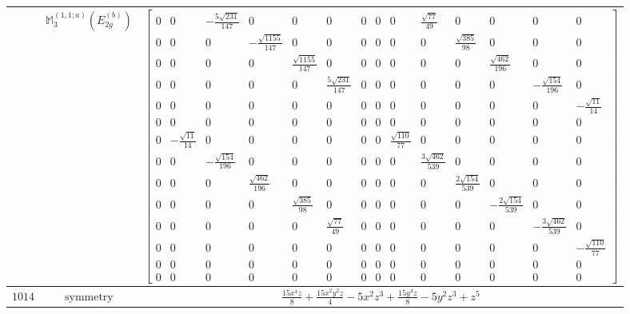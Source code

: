 \documentclass[fleqn,8pt,landscape]{jsarticle}
\begin{document}
\begin{longtable}{ccc}
$  $ & $ \mathbb{M}_{3}^{(1,1;a)}(E_{2g}^{(b)}) $ & $ \begin{bmatrix} 0 & 0 & - \frac{5 \sqrt{231}}{147} & 0 & 0 & 0 & 0 & 0 & 0 & \frac{\sqrt{77}}{49} & 0 & 0 & 0 & 0 \\ 0 & 0 & 0 & - \frac{\sqrt{1155}}{147} & 0 & 0 & 0 & 0 & 0 & 0 & \frac{\sqrt{385}}{98} & 0 & 0 & 0 \\ 0 & 0 & 0 & 0 & \frac{\sqrt{1155}}{147} & 0 & 0 & 0 & 0 & 0 & 0 & \frac{\sqrt{462}}{196} & 0 & 0 \\ 0 & 0 & 0 & 0 & 0 & \frac{5 \sqrt{231}}{147} & 0 & 0 & 0 & 0 & 0 & 0 & - \frac{\sqrt{154}}{196} & 0 \\ 0 & 0 & 0 & 0 & 0 & 0 & 0 & 0 & 0 & 0 & 0 & 0 & 0 & - \frac{\sqrt{11}}{14} \\ 0 & 0 & 0 & 0 & 0 & 0 & 0 & 0 & 0 & 0 & 0 & 0 & 0 & 0 \\ 0 & - \frac{\sqrt{11}}{14} & 0 & 0 & 0 & 0 & 0 & 0 & \frac{\sqrt{110}}{77} & 0 & 0 & 0 & 0 & 0 \\ 0 & 0 & - \frac{\sqrt{154}}{196} & 0 & 0 & 0 & 0 & 0 & 0 & \frac{3 \sqrt{462}}{539} & 0 & 0 & 0 & 0 \\ 0 & 0 & 0 & \frac{\sqrt{462}}{196} & 0 & 0 & 0 & 0 & 0 & 0 & \frac{2 \sqrt{154}}{539} & 0 & 0 & 0 \\ 0 & 0 & 0 & 0 & \frac{\sqrt{385}}{98} & 0 & 0 & 0 & 0 & 0 & 0 & - \frac{2 \sqrt{154}}{539} & 0 & 0 \\ 0 & 0 & 0 & 0 & 0 & \frac{\sqrt{77}}{49} & 0 & 0 & 0 & 0 & 0 & 0 & - \frac{3 \sqrt{462}}{539} & 0 \\ 0 & 0 & 0 & 0 & 0 & 0 & 0 & 0 & 0 & 0 & 0 & 0 & 0 & - \frac{\sqrt{110}}{77} \\ 0 & 0 & 0 & 0 & 0 & 0 & 0 & 0 & 0 & 0 & 0 & 0 & 0 & 0 \\ 0 & 0 & 0 & 0 & 0 & 0 & 0 & 0 & 0 & 0 & 0 & 0 & 0 & 0 \end{bmatrix} $ \\ \hline
$ 1014 $ & $ \text{symmetry} $ & $ \frac{15 x^{4} z}{8} + \frac{15 x^{2} y^{2} z}{4} - 5 x^{2} z^{3} + \frac{15 y^{4} z}{8} - 5 y^{2} z^{3} + z^{5} $ \\

\end{longtable}
\end{document}
